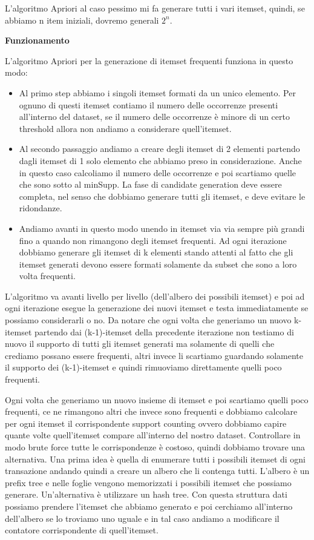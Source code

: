 \documentclass[14pt]{extreport}
\begin{document}
L'algoritmo Apriori al caso pessimo mi fa generare tutti i vari itemset, quindi, se abbiamo n item iniziali, dovremo generali $2^n$.

\textbf{Funzionamento}

L'algoritmo Apriori per la generazione di itemset frequenti funziona in questo modo:
\begin{itemize}
    \item Al primo step abbiamo i singoli itemset formati da un unico elemento. Per ognuno di questi itemset contiamo il numero delle occorrenze presenti all'interno del dataset, se il numero delle occorrenze è minore di un certo threshold allora non andiamo a considerare quell'itemset.
    \item Al secondo passaggio andiamo a creare degli itemset di 2 elementi partendo dagli itemset di 1 solo elemento che abbiamo preso in considerazione. Anche in questo caso calcoliamo il numero delle occorrenze e poi scartiamo quelle che sono sotto al minSupp.
    La fase di candidate generation deve essere completa, nel senso che dobbiamo generare tutti gli itemset, e deve evitare le ridondanze.
    \item Andiamo avanti in questo modo unendo in itemset via via sempre più grandi fino a quando non rimangono degli itemset frequenti. Ad ogni iterazione dobbiamo generare gli itemset di k elementi stando attenti al fatto che gli itemset generati devono essere formati solamente da subset che sono a loro volta frequenti.
\end{itemize}

L'algoritmo va avanti livello per livello (dell'albero dei possibili itemset) e poi ad ogni iterazione esegue la generazione dei nuovi itemset e testa immediatamente se possiamo considerarli o no.
Da notare che ogni volta che generiamo un nuovo k-itemset partendo dai (k-1)-itemset della precedente iterazione non testiamo di nuovo il supporto di tutti gli itemset generati ma solamente di quelli che crediamo possano essere frequenti, altri invece li scartiamo guardando solamente il supporto dei (k-1)-itemset e quindi rimuoviamo direttamente quelli poco frequenti.

Ogni volta che generiamo un nuovo insieme di itemset e poi scartiamo quelli poco frequenti, ce ne rimangono altri che invece sono frequenti e dobbiamo calcolare per ogni itemset il corrispondente support counting ovvero dobbiamo capire quante volte quell'itemset compare all'interno del nostro dataset.
Controllare in modo brute force tutte le corrispondenze è costoso, quindi dobbiamo trovare una alternativa.
Una prima idea è quella di enumerare tutti i possibili itemset di ogni transazione andando quindi a creare un albero che li contenga tutti. L'albero è un prefix tree e nelle foglie vengono memorizzati i possibili itemset che possiamo generare. Un'alternativa è utilizzare un hash tree.
Con questa struttura dati possiamo prendere l'itemset che abbiamo generato e poi cerchiamo all'interno dell'albero se lo troviamo uno uguale e in tal caso andiamo a modificare il contatore corrispondente di quell'itemset.
\end{document}
